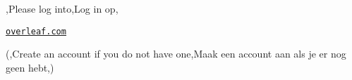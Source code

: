 \begin{frame}
	\titlepage
	\centering

	{\Large \lang,Please log into,Log in op,}

	\vspace{10pt}
	\href{https://www.overleaf.com}{\huge\ul{\texttt{overleaf.com}}}

	\vspace{10pt}
	{\small (\lang,Create an account if you do not have one,Maak een account aan als je er nog geen hebt,)}
\end{frame}